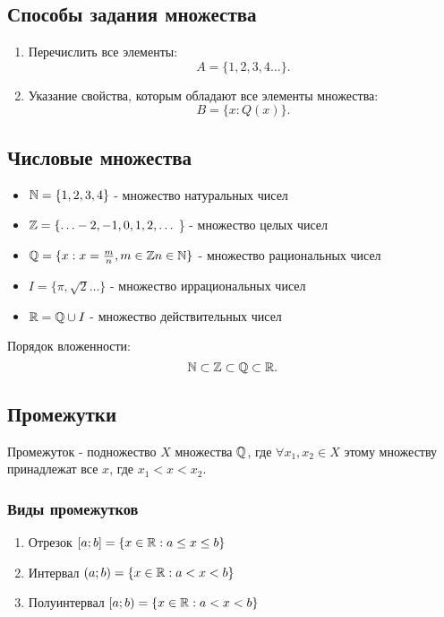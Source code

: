 \subsection{Способы задания множества}

\begin{enumerate}
  \item Перечислить все элементы:
   \[
  A = \{1, 2, 3, 4 \ldots\} 
  .\] 
  \item Указание свойства, которым обладают все элементы множества:
  \[
  B = \{x : Q(x)\} 
  .\] 
\end{enumerate}

\subsection{Числовые множества}
\begin{itemize}
  \item $\mathbb{N} = \{1, 2, 3, 4\} $ - множество натуральных чисел\\
  \item $\mathbb{Z} = \{ \ldots -2, -1, 0, 1, 2, \ldots$ \} - множество целых чисел\\
  \item $\mathbb{Q} = \{x : x = \frac{m}{n}, m\in \mathbb{Z} n\in \mathbb{N}\} $ - множество рациональных чисел\\
  \item $I = \{\pi, \sqrt{2}\ldots \} $ - множество иррациональных чисел\\
  \item $\mathbb{R} = \mathbb{Q} \cup I $ - множество действительных чисел
\end{itemize}
\begin{note}
  Порядок вложенности:
  \[
  \mathbb{N} \subset \mathbb{Z} \subset \mathbb{Q} \subset \mathbb{R}
  .\] 
\end{note}

\subsection{Промежутки}
\begin{definition}
  Промежуток - подножество $X$ множества $\mathbb{Q}$, где $\forall x_1, x_2\in X$ этому множеству принадлежат все $x$, где $x_1 < x < x_2$.
\end{definition}

\subsubsection{Виды промежутков}
\begin{enumerate}
  \item Отрезок $[a;b] = \{x\in \mathbb{R} : a \le x \le b\} $ \\
  \item Интервал $(a; b) = \{x\in \mathbb{R} : a < x < b\} $\\
  \item Полуинтервал $[a; b) = \{x\in \mathbb{R}: a < x < b\} $ \\ 
\end{enumerate}

